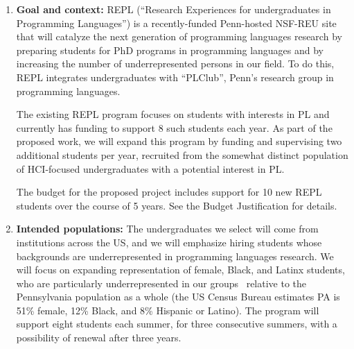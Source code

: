 \begin{enumerate}
\item {\bf Goal and context:} REPL (``Research Experiences for
undergraduates in Programming Languages'') is a recently-funded
Penn-hosted NSF-REU site that will catalyze the next generation of
programming languages research by preparing students for PhD programs
in programming languages and by increasing the number of
underrepresented persons in our field. To do this, REPL integrates
undergraduates with ``PLClub'', Penn’s research group in programming
languages.

The existing REPL program focuses on students with interests in PL and
currently has funding to support 8 such students each year.  As part
of the proposed work, we will expand this program by funding and
supervising two additional students per year, recruited from the
somewhat distinct population of HCI-focused undergraduates with a
potential interest in PL.

The budget for the proposed project includes support for 10 new REPL
students over the course of 5 years.  See the Budget Justification for
details.

\item {\bf Intended populations:} The undergraduates we select will
come from institutions across the US, and we will emphasize hiring
students whose backgrounds are underrepresented in programming
languages research.
%
%
We will focus on expanding representation of
female, Black, and Latinx students, who are particularly
underrepresented in our
groups~\cite{taulbee2019} relative to the Pennsylvania population as a
whole (the US Census Bureau
estimates PA is 51\% female, 12\% Black, and 8\% Hispanic or Latino).  The
program will support eight students  each
summer, for three consecutive summers, with a possibility of renewal
after three years.


\end{enumerate}
